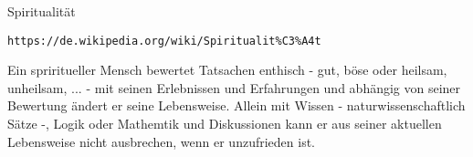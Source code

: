 \documentclass[10pt,a4paper]{article}
\begin{document}
Spiritualität

\verb+https://de.wikipedia.org/wiki/Spiritualit%C3%A4t+

Ein spriritueller Mensch bewertet Tatsachen enthisch - gut, böse oder heilsam,
unheilsam, ... - mit seinen Erlebnissen und Erfahrungen und abhängig von seiner
Bewertung ändert er seine Lebensweise. Allein mit Wissen - naturwissenschaftlich
Sätze -, Logik oder Mathemtik und Diskussionen kann er aus seiner aktuellen
Lebensweise nicht ausbrechen, wenn er unzufrieden ist.

\end{document}
